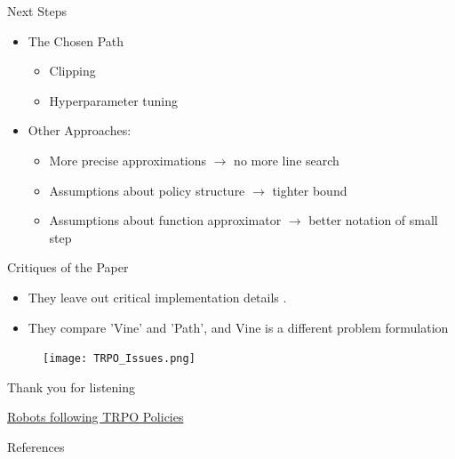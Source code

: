 \documentclass{beamer}
\begin{document}
\begin{frame}{Next Steps}
    \begin{itemize}
        \item The Chosen Path
        \begin{itemize}
            \item Clipping
            \item Hyperparameter tuning
        \end{itemize}
        \vspace{10pt}
        \item Other Approaches:
        \begin{itemize}
            \item More precise approximations $\rightarrow$ no more line search
            \item Assumptions about policy structure $\rightarrow$ tighter bound 
            \item Assumptions about function approximator $\rightarrow$ better notation of small step
        \end{itemize}
    \end{itemize}

\end{frame}

\newcommand{\bluecheck}{}%
\DeclareRobustCommand{\greencheck}{%
  \tikz\fill[scale=0.4, color=green]
  (0,.35) -- (.25,0) -- (1,.7) -- (.25,.15) -- cycle;%
}
\newcommand{\tikzxmark}{%
\tikz[scale=0.23, color=red] {
    \draw[line width=0.7,line cap=round] (0,0) to [bend left=6] (1,1);
    \draw[line width=0.7,line cap=round] (0.2,0.95) to [bend right=3] (0.8,0.05);
}}



\begin{frame}{Critiques of the Paper}
   
    \begin{itemize}
        \item They leave out critical implementation details \citep{deepRL_matters}. 
        \item They compare 'Vine' and 'Path', and Vine is a different problem formulation 
    \end{itemize}

\begin{figure}
    \centering
    \texttt{[image: TRPO\_Issues.png]}
    \label{fig:issues}
\end{figure}

\end{frame}


\begin{frame}{Thank you for listening}

\href{https://www.youtube.com/watch?v=ovDfhvjpQd8&t=387s}{Robots following TRPO Policies}

\end{frame}




\begin{frame}{References}
    
    
\end{frame}
\end{document}
